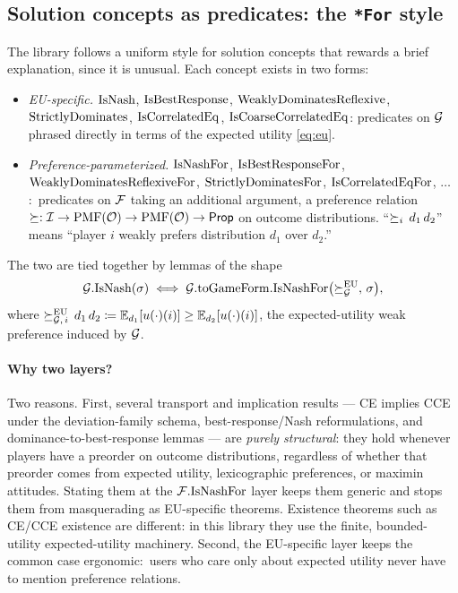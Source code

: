 
\subsection{Solution concepts as predicates: the \texttt{*For} style}
\label{sec:semantic-core:for-style}

The library follows a uniform style for solution concepts that
rewards a brief explanation, since it is unusual.  Each concept
exists in two forms:
\begin{itemize}
\item \emph{EU-specific.} $\mathrm{IsNash}$, $\mathrm{IsBestResponse}$,
$\mathrm{WeaklyDominatesReflexive}$, $\mathrm{StrictlyDominates}$, $\mathrm{IsCorrelatedEq}$, $\mathrm{IsCoarseCorrelatedEq}$:
  predicates on $\mathcal{G}$ phrased directly in terms of the expected
  utility \eqref{eq:eu}.

\item \emph{Preference-parameterized.} $\mathrm{IsNashFor}$,
  $\mathrm{IsBestResponseFor}$, $\mathrm{WeaklyDominatesReflexiveFor}$, $\mathrm{StrictlyDominatesFor}$,
  $\mathrm{IsCorrelatedEqFor}$, $\ldots$:\ predicates on $\mathcal{F}$
  taking an additional argument, a preference relation
  $\succeq : \mathcal{I} \to \mathrm{PMF}(\mathcal{O}) \to \mathrm{PMF}(\mathcal{O}) \to \mathsf{Prop}$
  on outcome distributions.  ``$\succeq_i \,d_1\,d_2$'' means
  ``player $i$ weakly prefers distribution $d_1$ over $d_2$.''
\end{itemize}
The two are tied together by lemmas of the shape
\[
  \mathcal{G}.\mathrm{IsNash}(\sigma) \;\Longleftrightarrow\;
    \mathcal{G}.\mathrm{toGameForm}.\mathrm{IsNashFor}\bigl(\succeq^{\mathrm{EU}}_{\mathcal{G}},\,\sigma\bigr),
\]
where $\succeq^{\mathrm{EU}}_{\mathcal{G},\,i}\,d_1\,d_2 \coloneqq \mathbb{E}_{d_1}[u(\cdot)(i)] \ge
\mathbb{E}_{d_2}[u(\cdot)(i)]$, the expected-utility weak
preference induced by $\mathcal{G}$.

\paragraph{Why two layers?}  Two reasons.  First, several
transport and implication results — CE implies CCE under the
deviation-family schema, best-response/Nash reformulations, and
dominance-to-best-response lemmas — are \emph{purely structural}:
they hold whenever players have a preorder on outcome
distributions, regardless of whether that preorder comes from
expected utility, lexicographic preferences, or maximin attitudes.
Stating them at the $\mathcal{F}.\mathrm{IsNashFor}$ layer keeps them generic and
stops them from masquerading as EU-specific theorems.  Existence
theorems such as CE/CCE existence are different: in this library
they use the finite, bounded-utility expected-utility machinery.
Second, the EU-specific layer keeps the common case ergonomic:\
users who care only about expected
utility never have to mention preference relations.


